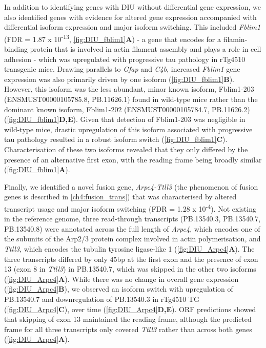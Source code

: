 In addition to identifying genes with DIU without differential gene expression, we also identified genes with evidence for altered gene expression accompanied with differential isoform expression and major isoform switching. This included \textit{Fblim1} (FDR = 1.87 x 10\textsuperscript{-13}, \cref{fig:DIU_fblim1}\textbf{A}) - a gene that encodes for a filamin-binding protein that is involved in actin filament assembly and plays a role in cell adhesion\cite{Takafuta2003} - which was upregulated with progressive tau pathology in rTg4510 transgenic mice. Drawing parallels to \textit{Gfap} and \textit{C4b}, increased \textit{Fblim1} gene expression was also primarily driven by one isoform (\cref{fig:DIU_fblim1}\textbf{B}). However, this isoform was the less abundant, minor known isoform, Fblim1-203 (ENSMUST00000105785.8, PB.11626.1) found in wild-type mice rather than the dominant known isoform, Fblim1-202 (ENSMUST00000105784.7, PB.11626.2) (\cref{fig:DIU_fblim1}\textbf{D,E}). Given that detection of Fblim1-203 was negligible in wild-type mice, drastic upregulation of this isoform associated with progressive tau pathology resulted in a robust isoform switch (\cref{fig:DIU_fblim1}\textbf{C}). Characterisation of these two isoforms revealed that they only differed by the presence of an alternative first exon, with the reading frame being broadly similar (\cref{fig:DIU_fblim1}\textbf{A}). 

Finally, we identified a novel fusion gene, \textit{Arpc4-Ttll3} (the phenomenon of fusion genes is described in \cref{ch4:fusion_trans}) that was characterised by altered transcript usage and major isoform switching (FDR = 1.28 x 10\textsuperscript{-4}). Not existing in the reference genome, three read-through transcripts (PB.13540.3, PB.13540.7, PB.13540.8) were annotated across the full length of \textit{Arpc4}, which encodes one of the subunits of the Arp2/3 protein complex involved in actin polymerisation, and \textit{Ttll3}, which encodes the tubulin tyrosine ligase-like 1 (\cref{fig:DIU_Arpc4}\textbf{A}). The three transcripts differed by only 45bp at the first exon and the presence of exon 13 (exon 8 in \textit{Ttll3}) in PB.13540.7, which was skipped in the other two isoforms (\cref{fig:DIU_Arpc4}\textbf{A}). While there was no change in overall gene expression (\cref{fig:DIU_Arpc4}\textbf{B}), we observed an isoform switch with upregulation of PB.13540.7 and downregulation of PB.13540.3 in rTg4510 TG (\cref{fig:DIU_Arpc4}\textbf{C}), over time (\cref{fig:DIU_Arpc4}\textbf{D,E}). ORF predictions showed that skipping of exon 13 maintained the reading frame, although the predicted frame for all three transcripts only covered \textit{Ttll3} rather than across both genes (\cref{fig:DIU_Arpc4}\textbf{A}).  

